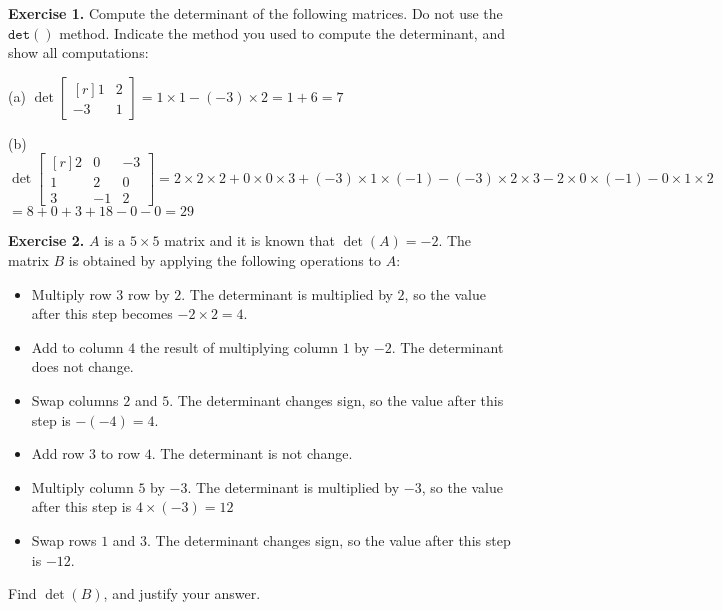 \documentclass[12pt]{article}
\begin{document}
\bigskip
\textbf{Exercise 1.} Compute the determinant of the following matrices. Do not use the $\mathtt{det()}$ method. Indicate the method you used to compute the determinant, and show all computations:

\medskip
(a) $\det\left[\begin{matrix*}[r]1 & 2\\-3 & 1\end{matrix*}\right]=1\times 1-(-3)\times 2=1+6=7$
\proofend

\medskip
(b) $\det\left[\begin{matrix*}[r]2 & 0 & -3\\1 & 2 & 0\\3 & -1 & 2\end{matrix*}\right]=
2\times2\times2 + 0\times0\times3+(-3)\times1\times(-1)-(-3)\times2\times3-2\times0\times(-1)-0\times1\times2$
$=8+0+3+18-0-0=29$

\bigskip
\textbf{Exercise 2.} $A$ is a $5\times 5$ matrix and it is known that $\det(A)=-2$. The matrix $B$ is obtained by applying the following operations to $A$:
\begin{itemize}
\item Multiply row $3$ row by $2$. The determinant is multiplied by $2$, so the value after this step becomes $-2\times 2=4.$
\item Add to column $4$ the result of multiplying column $1$ by $-2$. The determinant does not change.
\item Swap columns $2$ and $5$. The determinant changes sign, so the value after this step is $-(-4)=4$.
\item Add row $3$ to row $4$. The determinant is not change.
\item Multiply column $5$ by $-3$. The determinant is multiplied by $-3$, so the value after this step is $4\times(-3)=12$
\item Swap rows $1$ and $3$. The determinant changes sign, so the value after this step is $-12$.
\end{itemize} 
Find $\det(B)$, and justify your answer.
\end{document}

